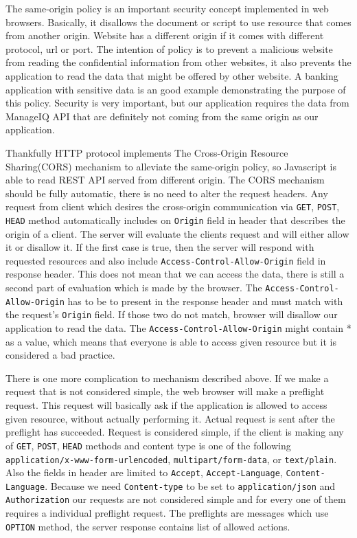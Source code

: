 The same-origin policy\cite{policy} is an important security concept implemented in web browsers. Basically, it disallows the document or script to use resource that comes from another origin. Website has a different origin if it comes with different protocol, url or port. The intention of policy is to prevent a malicious website from reading the confidential information from other websites, it also prevents the application to read the data that might be offered by other website. A banking application with sensitive data is an good example demonstrating the purpose of this policy. Security is very important, but our application requires the data from ManageIQ API that are definitely not coming from the same origin as our application.

Thankfully HTTP protocol implements The Cross-Origin Resource Sharing(CORS)\cite{cors} mechanism to alleviate the same-origin policy, so Javascript is able to read REST API served from different origin. The CORS mechanism should be fully automatic, there is no need to alter the request headers. Any request from client which desires the cross-origin communication via \texttt{GET}, \texttt{POST}, \texttt{HEAD} method automatically includes on \texttt{Origin} field in header that describes the origin of a client. The server will evaluate the clients request and will either allow it or disallow it. If the first case is true, then the server will respond with requested resources and also include \texttt{Access-Control-Allow-Origin} field in response header. This does not mean that we can access the data, there is still a second part of evaluation which is made by the browser. The \texttt{Access-Control-Allow-Origin} has to be to present in the response header and must match with the request's \texttt{Origin} field. If those two do not match, browser will disallow our application to read the data. The \texttt{Access-Control-Allow-Origin} might contain * as a value, which means that everyone is able to access given resource but it is considered a bad practice.

There is one more complication to mechanism described above. If we make a request that is not considered simple, the web browser will make a preflight request. This request will basically ask if the application is allowed to access given resource, without actually performing it. Actual request is sent after the preflight has succeeded. Request is considered simple, if the client is making any of \texttt{GET}, \texttt{POST}, \texttt{HEAD} methods and content type is one of the following \texttt{application/x-www-form-urlencoded}, \texttt{multipart/form-data}, or \texttt{text/plain}. Also the fields in header are limited to \texttt{Accept}, \texttt{Accept-Language}, \texttt{Content-Language}. Because we need \texttt{Content-type} to be set to \texttt{application/json} and \texttt{Authorization} our requests are not considered simple and for every one of them requires a individual preflight request. The preflights are messages which use \texttt{OPTION} method, the server response contains list of allowed actions.

